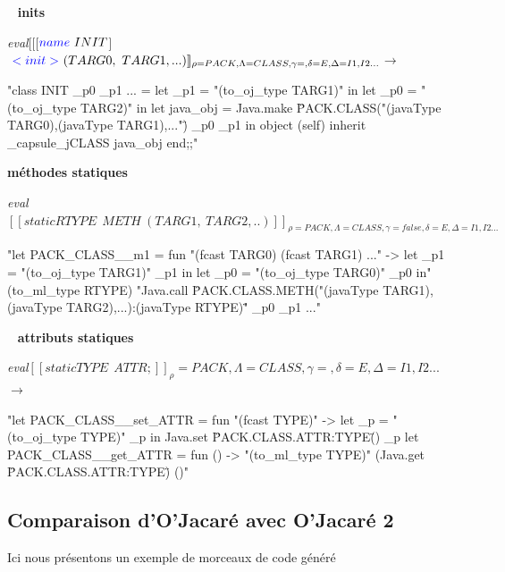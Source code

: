 \documentclass[a4paper, 11pt]{article}
\begin{document}
\ 
\newline
\noindent
\textbf{ inits }

\noindent
\emph{eval}$[\![$[$ {\color{blue}name}\ INIT $]$\ {\color{blue}
      <init>}\ (TARG0,\ TARG1, ...)]\!]_{\rho=PACK,\Lambda=CLASS,\gamma=,\delta=E,\Delta=I1,I2...}$$\longrightarrow$
% 

\begin{OCaml}
"class INIT _p0 _p1 ... =
  let _p1 = "(to_oj_type TARG1)"  in
  let _p0 = "(to_oj_type TARG2)" in
  let java_obj = Java.make \"PACK.CLASS("(javaType
           TARG0),(javaType TARG1),...")\" _p0 _p1
  in 
  object (self) 
     inherit _capsule_jCLASS java_obj 
  end;;"
\end{OCaml}



\newpage
\noindent
\textbf{ méthodes statiques }

\noindent
\emph{eval}$[\![static RTYPE\ \ METH\ (TARG1,\ TARG2,..)]\!]_{\rho=PACK,\Lambda=CLASS,\gamma=false,\delta=E,\Delta=I1,I2... }$

\begin{OCaml}
"let PACK_CLASS__m1 =
 fun "(fcast TARG0) (fcast TARG1) ..." ->
           let _p1 = "(to_oj_type TARG1)" _p1 in
           let _p0 = "(to_oj_type TARG0)" _p0
           in"
             (to_ml_type RTYPE)
             "Java.call \"PACK.CLASS.METH("(javaType TARG1),(javaType TARG2),...):(javaType RTYPE)"\" _p0 _p1 ..."
\end{OCaml}

\ 
\newline
\noindent
\textbf{ attributs statiques }


\noindent
\emph{eval}$[\![static TYPE\ \ ATTR; ]\!]_\rho=PACK,\Lambda=CLASS,\gamma=,\delta=E,\Delta=I1,I2...{}$$\longrightarrow$

\begin{OCaml}
"let PACK_CLASS__set_ATTR =
           fun "(fcast TYPE)" ->
              let _p = "(to_oj_type TYPE)" _p
              in Java.set \"PACK.CLASS.ATTR:TYPE\" () _p
let PACK_CLASS__get_ATTR =
        fun () ->
           "(to_ml_type TYPE)" (Java.get \"PACK.CLASS.ATTR:TYPE\") ()"
\end{OCaml}



\subsection{Comparaison d'O'Jacaré avec O'Jacaré 2}

Ici nous présentons un exemple de morceaux de code généré 
\end{document}
